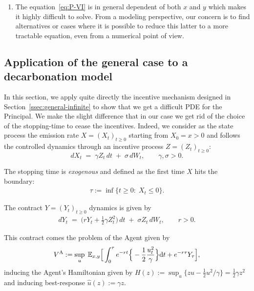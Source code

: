 \documentclass[a4paper,10pt]{article}
\newcommand{\dd}{\mathrm{d}}
\theoremstyle{definition}
\theoremstyle{plain}
\numberwithin{equation}{section}
\begin{document}
\begin{enumerate}[\upshape (i)]

\item The equation~\eqref{eq:P-VI} is in general dependent of both $x$ and $y$ which makes it highly difficult to solve. From a modeling perspective, our concern is to find alternatives or cases where it is possible to reduce this latter to a more tractable equation, even from a numerical point of view. 

\end{enumerate}

\subsection{Application of the general case to a decarbonation model} \label{ssec:incentives}

In this section, we apply quite directly the incentive mechanism designed in Section~\ref{ssec:general-infinite} to show that we get a difficult PDE for the Principal. We make  the slight difference that in our case we get rid of the choice of the stopping-time to cease the incentives. Indeed, we consider as the state process the emission rate
$X=(X_t)_{t\ge 0}$ starting from $X_0=x>0$ and follows the controlled dynamics through an incentive process $Z=(Z_t)_{t\ge 0}$:
\begin{equation}
\label{eq:X-dyn}
dX_t \;=\; \gamma Z_t\,dt \;+\; \sigma \,dW_t,
\qquad \gamma, \sigma>0.
\end{equation}

The stopping time is \emph{exogenous} and defined as the first time $X$ hits the boundary:
\begin{align} \label{eq:tau}
\tau :=  \inf\{t\ge 0:\; X_t \le 0\}.
\end{align}

The contract $Y=(Y_t)_{t\ge 0}$  dynamics is given by 
\begin{align}\label{eq:Y-dyn}
dY_t \;=\; \Big(rY_t + \frac{1}{2} \gamma  Z_t^2\Big)\,dt \;+\; \sigma Z_t\,dW_t,
\qquad r>0.
\end{align}

This contract comes the problem of the Agent given by
\begin{align}
V^{\rm A} :=
\sup_{u}\;
\mathbb{E}_{x,y}\Big[
\int_0^\tau  e^{-r t} \Big\{ - \frac12 \frac{u _t^2}{\gamma}\Big\} \dd t + e^{-r \tau}Y_\tau
\Big],
\end{align}
inducing the Agent's Hamiltonian given by $H(z) := \sup_{u} \big\{ z u - \frac12 u^2/\gamma\} = \frac12 \gamma z^2$ and inducing best-response $\hat u(z) := \gamma z$.
\end{document}
